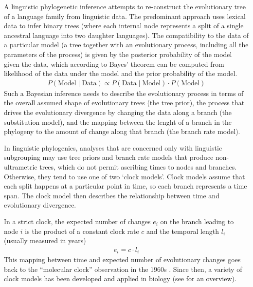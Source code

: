 \documentclass[]{rsos}%
\begin{document}
A linguistic phylogenetic inference attempts to re-construct the evolutionary
tree of a language family from linguistic data. The predominant approach uses
lexical data to infer binary trees (where each internal node represents a split
of a single ancestral language into two daughter languages). The compatibility to the data
of a particular model (a tree together with an evolutionary process, including
all the parameters of the process) is given by the posterior probability of the
model given the data, which according to Bayes' theorem can be computed from
likelihood of the data under the model and the prior probability of the model.
\begin{align}
    P(\text{Model}\mid\text{Data}) \propto P(\text{Data}\mid\text{Model}) \cdot P(\text{Model})
\end{align}
Such a Bayesian inference needs to describe the evolutionary process in terms of
the overall assumed shape of evolutionary trees (the tree prior), the process
that drives the evolutionary divergence by changing the data along a branch (the
substitution model), and the mapping between the lenght of a branch in the
phylogeny to the amount of change along that branch (the branch rate model).

In linguistic phylogenies, analyses that are concerned only with linguistic
subgrouping may use tree priors and branch rate models that produce
non-ultrametric trees, which do not permit ascribing times to nodes and
branches. Otherwise, they tend to use one of two ‘clock models’. Clock models
assume that each split happens at a particular point in time, so each branch
represents a time span. The clock model then describes the relationship between time and
evolutionary divergence.

In a strict clock,
the expected number of changes $e_i$ on the branch leading to node $i$ is the product of a constant clock rate $c$ and the temporal length $l_i$ (usually measured in years)
\begin{align}
  e_i = c \cdot l_i
  \label{eq:strict}
\end{align}
This mapping between time and expected number of evolutionary changes goes back
to the “molecular clock” observation in the 1960s
\parencite{zuckerkandl1965evolutionary,kumar2005molecular}. Since then, a variety of clock models
has been developed and applied in biology (see \parencite{ho2014molecularclock} for an
overview).
\end{document}
